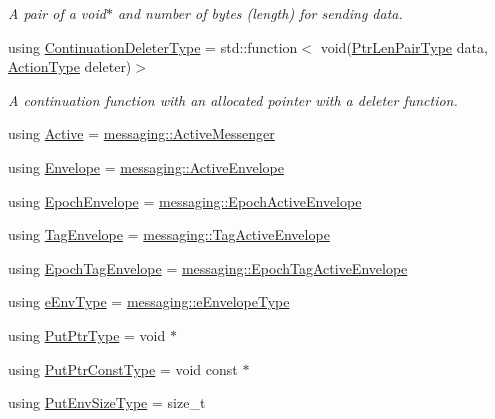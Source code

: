 \begin{DoxyCompactItemize}
\begin{DoxyCompactList}\small\item\em A pair of a void$\ast$ and number of bytes (length) for sending data. \end{DoxyCompactList}\item 
using \hyperlink{namespacevt_a6de3bd201e2a040be9362d9d24d1e446}{Continuation\+Deleter\+Type} = std\+::function$<$ void(\hyperlink{namespacevt_a97f320a1d3b9b4035e591671cd7d10f0}{Ptr\+Len\+Pair\+Type} data, \hyperlink{namespacevt_ae0a5a7b18cc99d7b732cb4d44f46b0f3}{Action\+Type} deleter)$>$
\begin{DoxyCompactList}\small\item\em A continuation function with an allocated pointer with a deleter function. \end{DoxyCompactList}\item 
using \hyperlink{namespacevt_ad548cc368cddb926753ac237eb454dae}{Active} = \hyperlink{structvt_1_1messaging_1_1_active_messenger}{messaging\+::\+Active\+Messenger}
\item 
using \hyperlink{namespacevt_aa9c8cc094b5361482021d63012987814}{Envelope} = \hyperlink{structvt_1_1messaging_1_1_active_envelope}{messaging\+::\+Active\+Envelope}
\item 
using \hyperlink{namespacevt_af71a025689a3da5037785b53a7a8e78c}{Epoch\+Envelope} = \hyperlink{structvt_1_1messaging_1_1_epoch_active_envelope}{messaging\+::\+Epoch\+Active\+Envelope}
\item 
using \hyperlink{namespacevt_a7b951ab92dca9319e12e3fc406ccb309}{Tag\+Envelope} = \hyperlink{structvt_1_1messaging_1_1_tag_active_envelope}{messaging\+::\+Tag\+Active\+Envelope}
\item 
using \hyperlink{namespacevt_af23b58014ced6898422213a0e5e6a27a}{Epoch\+Tag\+Envelope} = \hyperlink{structvt_1_1messaging_1_1_epoch_tag_active_envelope}{messaging\+::\+Epoch\+Tag\+Active\+Envelope}
\item 
using \hyperlink{namespacevt_abdfe9ac50e3799705ee21853c1509bf6}{e\+Env\+Type} = \hyperlink{namespacevt_1_1messaging_a6508ef3a4701a2e6fd0bfe3edcc63a6c}{messaging\+::e\+Envelope\+Type}
\item 
using \hyperlink{namespacevt_a537693bfe0223c71eb52bdbd6ea2c741}{Put\+Ptr\+Type} = void $\ast$
\item 
using \hyperlink{namespacevt_a494d6c6dc5cdb9a8d61eaedfa2c4d4f3}{Put\+Ptr\+Const\+Type} = void const  $\ast$
\item 
using \hyperlink{namespacevt_aa241444e21c15238e185923792814fe4}{Put\+Env\+Size\+Type} = size\+\_\+t

\end{DoxyCompactItemize}

